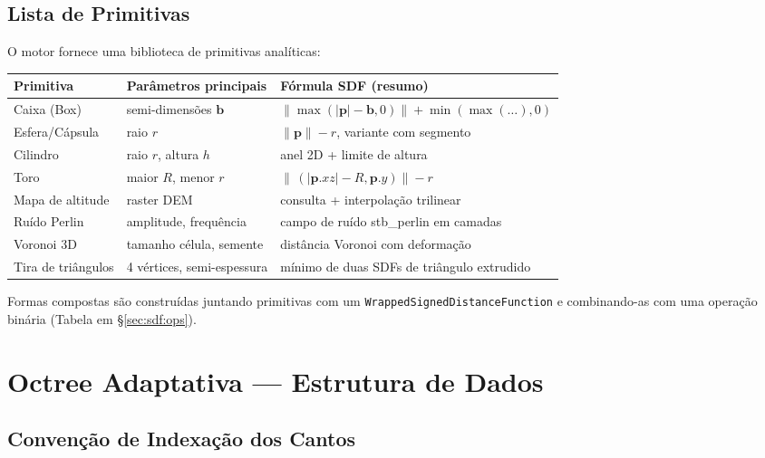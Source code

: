 \documentclass[10pt,a4paper]{article}
\begin{document}
\subsection{Lista de Primitivas}

O motor fornece uma biblioteca de primitivas analíticas:

\begin{center}
\begin{tabular}{lll}
  \toprule
  Primitiva & Parâmetros principais & Fórmula SDF (resumo)\\
  \midrule
  Caixa (Box)        & semi-dimensões $\mathbf{b}$ & $\|\max(|\mathbf{p}|-\mathbf{b},0)\| + \min(\max(\ldots),0)$\\
  Esfera/Cápsula     & raio $r$            & $\|\mathbf{p}\| - r$, variante com segmento\\
  Cilindro           & raio $r$, altura $h$  & anel 2D + limite de altura\\
  Toro               & maior $R$, menor $r$  & $\|\,(|\mathbf{p}.xz|-R,\mathbf{p}.y)\| - r$\\
  Mapa de altitude   & raster DEM           & consulta + interpolação trilinear\\
  Ruído Perlin       & amplitude, frequência & campo de ruído stb\_perlin em camadas\\
  Voronoi 3D         & tamanho célula, semente & distância Voronoi com deformação\\
  Tira de triângulos & 4 vértices, semi-espessura & mínimo de duas SDFs de triângulo extrudido\\
  \bottomrule
\end{tabular}
\end{center}

Formas compostas são construídas juntando primitivas com um
\lstinline{WrappedSignedDistanceFunction} e combinando-as com uma
operação binária (Tabela em \S\ref{sec:sdf:ops}).

\section{Octree Adaptativa — Estrutura de Dados}
\label{sec:octree}

\subsection{Convenção de Indexação dos Cantos}
\label{sec:octree:corners}
\end{document}

